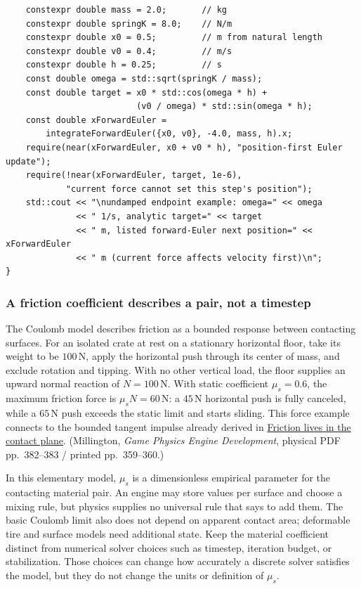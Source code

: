 \begin{verbatim}
    constexpr double mass = 2.0;       // kg
    constexpr double springK = 8.0;    // N/m
    constexpr double x0 = 0.5;         // m from natural length
    constexpr double v0 = 0.4;         // m/s
    constexpr double h = 0.25;         // s
    const double omega = std::sqrt(springK / mass);
    const double target = x0 * std::cos(omega * h) +
                          (v0 / omega) * std::sin(omega * h);
    const double xForwardEuler =
        integrateForwardEuler({x0, v0}, -4.0, mass, h).x;
    require(near(xForwardEuler, x0 + v0 * h), "position-first Euler update");
    require(!near(xForwardEuler, target, 1e-6),
            "current force cannot set this step's position");
    std::cout << "\nundamped endpoint example: omega=" << omega
              << " 1/s, analytic target=" << target
              << " m, listed forward-Euler next position=" << xForwardEuler
              << " m (current force affects velocity first)\n";
}
\end{verbatim}

\subsubsection{A friction coefficient describes a pair, not a timestep}\label{a-friction-coefficient-describes-a-pair-not-a-timestep}

The Coulomb model describes friction as a bounded response between contacting surfaces. For an isolated crate at rest on a stationary horizontal floor, take its weight to be \(100\,\mathrm N\), apply the horizontal push through its center of mass, and exclude rotation and tipping. With no other vertical load, the floor supplies an upward normal reaction of \(N=100\,\mathrm N\). With static coefficient \(\mu_s=0.6\), the maximum friction force is \(\mu_sN=60\,\mathrm N\): a \(45\,\mathrm N\) horizontal push is fully canceled, while a \(65\,\mathrm N\) push exceeds the static limit and starts sliding. This force example connects to the bounded tangent impulse already derived in \hyperref[06-engine-ii-ch033]{Friction lives in the contact plane}. (Millington, \emph{Game Physics Engine Development}, physical PDF pp.~382--383 / printed pp.~359--360.)

In this elementary model, \(\mu_s\) is a dimensionless empirical parameter for the contacting material pair. An engine may store values per surface and choose a mixing rule, but physics supplies no universal rule that says to add them. The basic Coulomb limit also does not depend on apparent contact area; deformable tire and surface models need additional state. Keep the material coefficient distinct from numerical solver choices such as timestep, iteration budget, or stabilization. Those choices can change how accurately a discrete solver satisfies the model, but they do not change the units or definition of \(\mu_s\).

